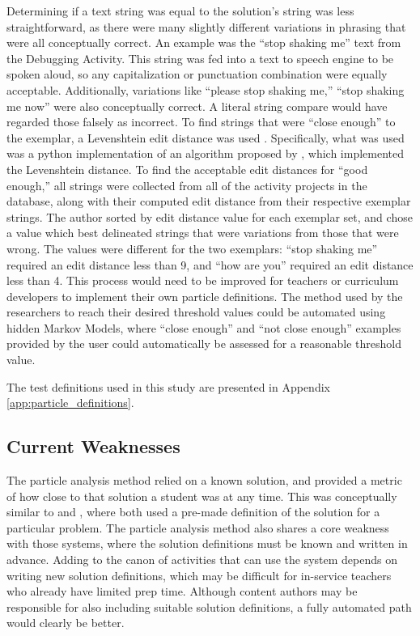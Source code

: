 \label{sec:close-enough-text} %
Determining if a text string was equal to the solution's string was less straightforward, as there were many slightly different variations in phrasing that were all conceptually correct. An example was the ``stop shaking me'' text from the Debugging Activity. This string was fed into a text to speech engine to be spoken aloud, so any capitalization or punctuation combination were equally acceptable. Additionally, variations like ``please stop shaking me,'' ``stop shaking me now'' were also conceptually correct. A literal string compare would have regarded those falsely as incorrect. To find strings that were ``close enough'' to the exemplar, a Levenshtein edit distance was used \citep{levenshtein1966binary}. Specifically, what was used was a python implementation of an algorithm proposed by \citet{hyyro2001explaining}, which implemented the Levenshtein distance. To find the acceptable edit distances for ``good enough,'' all strings were collected from all of the activity projects in the database, along with their computed edit distance from their respective exemplar strings. The author sorted by edit distance value for each exemplar set, and chose a value which best delineated strings that were variations from those that were wrong. The values were different for the two exemplars: ``stop shaking me'' required an edit distance less than 9, and ``how are you'' required an edit distance less than 4. This process would need to be improved for teachers or curriculum developers to implement their own particle definitions. The method used by the researchers to reach their desired threshold values could be automated using hidden Markov Models, where ``close enough'' and ``not close enough'' examples provided by the user could automatically be assessed for a reasonable threshold value.

The test definitions used in this study are presented in Appendix \ref{app:particle_definitions}. 

\subsection{Current Weaknesses}
The particle analysis method relied on a known solution, and provided a metric of how close to that solution a student was at any time. This was conceptually similar to \citet{le2007using} and \citet{mitrovic2003intelligent}, where both used a pre-made definition of the solution for a particular problem. The particle analysis method also shares a core weakness with those systems, where the solution definitions must be known and written in advance. Adding to the canon of activities that can use the system depends on writing new solution definitions, which may be difficult for in-service teachers who already have limited prep time. Although content authors may be responsible for also including suitable solution definitions, a fully automated path would clearly be better.

